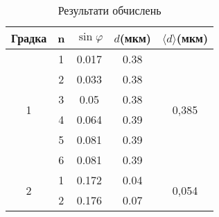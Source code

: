 \begin{table}
    \centering
    \begin{tabular}{|c|c|c|c|c|}
        \hline
        \textbf{Градка} & \textbf{n} & $\sin{\varphi}$ & $d$\textbf{(мкм)} & $\langle d \rangle$\textbf{(мкм)} \\        
        \hline
        \multirow{6}{*}{1} & 1 & 0.017  & 0.38 & \multirow{6}{*}{0,385} \\
        \cline{2-4}
         & 2 & 0.033 & 0.38  & \\         	                                        
        \cline{2-4}
        & 3 & 0.05 & 0.38 &\\
        \cline{2-4}
        & 4 & 0.064 & 0.39 &\\
        \cline{2-4}
        & 5 & 0.081 & 0.39 &\\
        \cline{2-4}
        & 6 & 0.081 & 0.39 &\\
        \hline

        \multirow{2}{*}{2} & 1 & 0.172 & 0.04 & \multirow{2}{*}{0,054} \\        
        \cline{2-4}
        & 2 & 0.176 & 0.07  &\\
        \hline
    \end{tabular}

    \caption{Результати обчислень}
\end{table}

